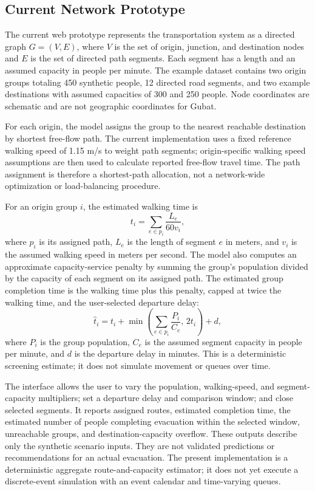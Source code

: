 \documentclass[conference]{IEEEtran}
\begin{document}
\subsection{Current Network Prototype}

The current web prototype represents the transportation system as a directed graph $G=(V,E)$, where $V$ is the set of origin, junction, and destination nodes and $E$ is the set of directed path segments. Each segment has a length and an assumed capacity in people per minute. The example dataset contains two origin groups totaling 450 synthetic people, 12 directed road segments, and two example destinations with assumed capacities of 300 and 250 people. Node coordinates are schematic and are not geographic coordinates for Gubat.

For each origin, the model assigns the group to the nearest reachable destination by shortest free-flow path. The current implementation uses a fixed reference walking speed of 1.15 m/s to weight path segments; origin-specific walking speed assumptions are then used to calculate reported free-flow travel time. The path assignment is therefore a shortest-path allocation, not a network-wide optimization or load-balancing procedure.

For an origin group $i$, the estimated walking time is
\begin{equation}
t_i = \sum_{e \in p_i} \frac{L_e}{60v_i},
\end{equation}
where $p_i$ is its assigned path, $L_e$ is the length of segment $e$ in meters, and $v_i$ is the assumed walking speed in meters per second. The model also computes an approximate capacity-service penalty by summing the group's population divided by the capacity of each segment on its assigned path. The estimated group completion time is the walking time plus this penalty, capped at twice the walking time, and the user-selected departure delay:
\begin{equation}
\hat{t}_i =
t_i + \min\left(\sum_{e \in p_i}\frac{P_i}{C_e},\,2t_i\right)+d,
\end{equation}
where $P_i$ is the group population, $C_e$ is the assumed segment capacity in people per minute, and $d$ is the departure delay in minutes. This is a deterministic screening estimate; it does not simulate movement or queues over time.

The interface allows the user to vary the population, walking-speed, and segment-capacity multipliers; set a departure delay and comparison window; and close selected segments. It reports assigned routes, estimated completion time, the estimated number of people completing evacuation within the selected window, unreachable groups, and destination-capacity overflow. These outputs describe only the synthetic scenario inputs. They are not validated predictions or recommendations for an actual evacuation. The present implementation is a deterministic aggregate route-and-capacity estimator; it does not yet execute a discrete-event simulation with an event calendar and time-varying queues.
\end{document}

